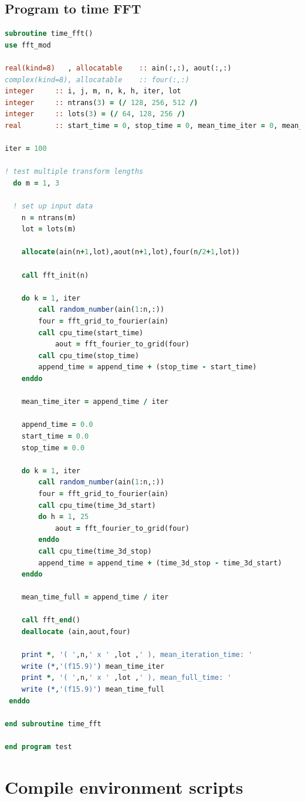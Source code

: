 \documentclass[a4paper,11pt]{report}
\newcommand{\toclesssection}[1]{\section{#1}\addtocounter{section}{1}}
\begin{document}
\toclesssection{Program to time FFT}
\begin{lstlisting}[language=Fortran]
subroutine time_fft()
use fft_mod

real(kind=8)   , allocatable 	:: ain(:,:), aout(:,:)
complex(kind=8), allocatable 	:: four(:,:)
integer 	:: i, j, m, n, k, h, iter, lot
integer 	:: ntrans(3) = (/ 128, 256, 512 /)
integer 	:: lots(3) = (/ 64, 128, 256 /)
real 	    :: start_time = 0, stop_time = 0, mean_time_iter = 0, mean_time_full = 0, append_time = 0, time_3d_start = 0, time_3d_stop = 0

iter = 100

! test multiple transform lengths
  do m = 1, 3

  ! set up input data
    n = ntrans(m)
    lot = lots(m)

    allocate(ain(n+1,lot),aout(n+1,lot),four(n/2+1,lot))

    call fft_init(n)

    do k = 1, iter
        call random_number(ain(1:n,:))
        four = fft_grid_to_fourier(ain)
        call cpu_time(start_time)
            aout = fft_fourier_to_grid(four)
        call cpu_time(stop_time)
        append_time = append_time + (stop_time - start_time)
    enddo

    mean_time_iter = append_time / iter

    append_time = 0.0
    start_time = 0.0
    stop_time = 0.0

    do k = 1, iter
        call random_number(ain(1:n,:))
        four = fft_grid_to_fourier(ain)
        call cpu_time(time_3d_start)
        do h = 1, 25
            aout = fft_fourier_to_grid(four)
        enddo
        call cpu_time(time_3d_stop)
        append_time = append_time + (time_3d_stop - time_3d_start)
    enddo

    mean_time_full = append_time / iter

    call fft_end()
    deallocate (ain,aout,four)

    print *, '( ',n,' x ' ,lot ,' ), mean_iteration_time: '
    write (*,'(f15.9)') mean_time_iter
    print *, '( ',n,' x ' ,lot ,' ), mean_full_time: '
    write (*,'(f15.9)') mean_time_full
 enddo

end subroutine time_fft

end program test
\end{lstlisting}


\chapter{Compile environment scripts}
\label{apdx:compile-env}
\end{document}
